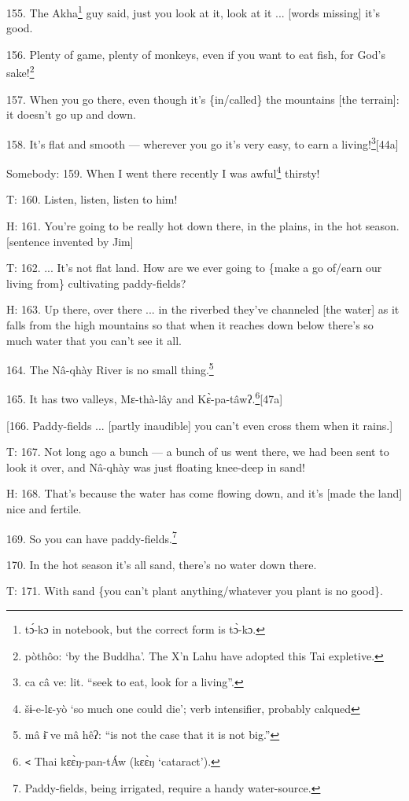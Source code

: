 155. The Akha\footnote{tɔ́-kɔ in notebook, but the correct form is tɔ̀-kɔ.} guy said, just you look at it, look at it ... [words missing]
it's good.

156. Plenty of game, plenty of monkeys, even if you want to eat fish, for God's
sake!\footnote{pòthôo: `by the Buddha'. The X'n Lahu have adopted this Tai expletive.}

157. When you go there, even though it's \{in/called\} the mountains [the terrain]:
it doesn't go up and down.

158. It's flat and smooth --- wherever you go it's very easy, to earn a living!\footnote{ca câ ve: lit. ``seek to eat, look for a living''.}[44a]

Somebody: 159. When I went there recently I was awful\footnote{šɨ-e-lɛ-yò `so much one could die'; verb intensifier, probably calqued} thirsty!

T: 160. Listen, listen, listen to him!

H: 161. You're going to be really hot down there, in the plains, in the hot season.
[sentence invented by Jim]

T: 162. ... It's not flat land. How are we ever going to \{make a go of/earn our
living from\} cultivating paddy-fields?

H: 163. Up there, over there ... in the riverbed they've channeled [the water]
as it falls from the high mountains so that when it reaches down below there's
so much water that you can't see it all.

164. The Nâ-qhày River is no small thing.\footnote{mâ ɨ̄ ve mâ hêʔ: ``is not the case that it is not big.''}

165. It has two valleys, Mɛ-thà-lây and Kɛ̀-pa-tâwʔ.\footnote{\texttt{<} Thai kɛɛ̀ŋ-pan-tÁw (kɛɛ̀ŋ `cataract').}[47a]

[166. Paddy-fields ... [partly inaudible] you can't even cross them when it rains.]

T: 167. Not long ago a bunch --- a bunch of us went there, we had been sent to
look it over, and Nâ-qhày was just floating knee-deep in sand!

H: 168. That's because the water has come flowing down, and it's [made the land]
nice and fertile.

169. So you can have paddy-fields.\footnote{Paddy-fields, being irrigated, require a handy water-source.}

170. In the hot season it's all sand, there's no water down there.

T: 171. With sand \{you can't plant anything/whatever you plant is no good\}.

